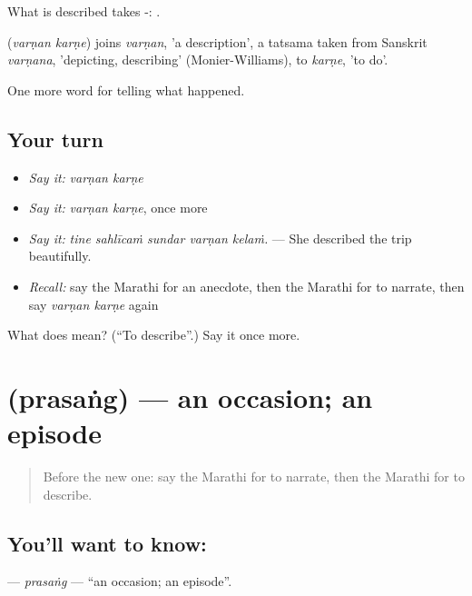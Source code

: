 What is described takes -:   .

\begin{cousinweb}
\textbf{ } (\emph{varṇan karṇe}) joins \emph{varṇan}, 'a description', a tatsama taken from Sanskrit \emph{varṇana}, 'depicting, describing' (Monier-Williams), to \emph{karṇe}, 'to do'.
\end{cousinweb}

\begin{grammarlens}[title={What you've built}]
One more word for telling what happened.
\end{grammarlens}

\subsection*{Your turn}
\begin{itemize}
\raggedright
  \item \emph{Say it:} \emph{varṇan karṇe}
  \item \emph{Say it:} \emph{varṇan karṇe}, once more
  \item \emph{Say it:} \emph{tine sahlīcaṁ sundar varṇan kelaṁ.} — She described the trip beautifully.
  \item \emph{Recall:} say the Marathi for an anecdote, then the Marathi for to narrate, then say \emph{varṇan karṇe} again
\end{itemize}

\begin{tcolorbox}[breakable,colback=teal!4,colframe=teal!35!black,title={Before you move on}]
What does   mean? (\textquotedblleft{}To describe\textquotedblright{}.) Say it once more.
\end{tcolorbox}
\section[\texorpdfstring{\mr{प्रसंग} (prasaṅg)}{प्रसंग (prasaṅg)}]{ (prasaṅg) — an occasion; an episode}

\label{lesson:MR-C304-prasang}



\begin{quote}
Before the new one: say the Marathi for to narrate, then the Marathi for to describe.
\end{quote}

\subsection*{You'll want to know: }
\textbf{} — \emph{prasaṅg} — \textquotedblleft{}an occasion; an episode\textquotedblright{}.

